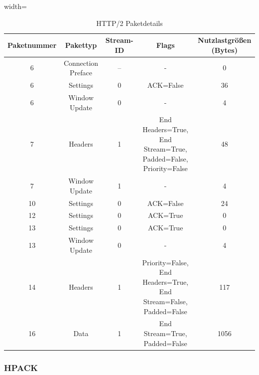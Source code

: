 \begin{table}
    \centering
    \begin{adjustbox}{width=\textwidth}
        \begin{tabular}{|c|c|c|c|c|}
            \hline
            \textbf{Paketnummer} & \textbf{Pakettyp} & \textbf{Stream-ID} & \textbf{Flags} & \textbf{Nutzlastgrößen (Bytes)} \\
            \hline
            6 & Connection Preface & -- & - & 0 \\
            6 & Settings & 0 & ACK=False & 36 \\
            6 & Window Update & 0 & - & 4 \\
            7 & Headers & 1 & End Headers=True, End Stream=True, Padded=False, Priority=False & 48 \\
            7 & Window Update & 1 & - & 4 \\
            10 & Settings & 0 & ACK=False & 24 \\
            12 & Settings & 0 & ACK=True & 0 \\
            13 & Settings & 0 & ACK=True & 0 \\
            13 & Window Update & 0 & - & 4 \\
            14 & Headers & 1 & Priority=False, End Headers=True, End Stream=False, Padded=False & 117 \\
            16 & Data & 1 & End Stream=True, Padded=False & 1056 \\
            \hline
        \end{tabular}
    \end{adjustbox}
    \caption{HTTP/2 Paketdetails}\label{tab:packet_details}
\end{table}

\subsubsection*{HPACK}

